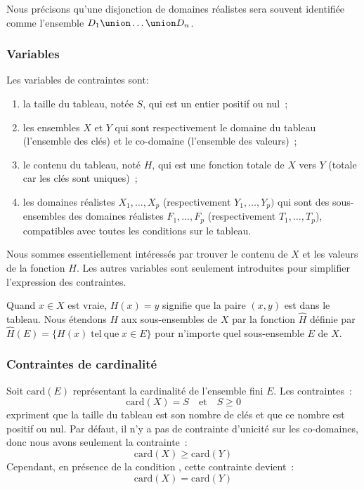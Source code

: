 Nous précisons qu'une disjonction de domaines réalistes  sera souvent identifiée comme l'ensemble $D_1 \union \dots \union
D_n$.

\subsubsection{Variables}

Les variables de contraintes sont:
%
\begin{enumerate}

\item la taille du tableau, notée $S$, qui est un entier positif ou nul~;

\item les ensembles $X$ et $Y$ qui sont respectivement le domaine du tableau
(l'ensemble des clés) et le co-domaine (l'ensemble des valeurs)~;

\item le contenu du tableau, noté $H$, qui est une fonction totale de $X$ vers
$Y$ (totale car les clés sont uniques)~;

\item les domaines réalistes $X_1, \dots, X_p$ (respectivement $Y_1, \dots,
Y_p)$ qui sont des sous-ensembles des domaines réalistes $F_1, \dots, F_p$
(respectivement $T_1, \dots, T_p$), compatibles avec toutes les conditions sur
le tableau.

\end{enumerate}

Nous sommes essentiellement intéressés par trouver le contenu de $X$ et les
valeurs de la fonction $H$. Les autres variables sont seulement introduites pour
simplifier l'expression des contraintes.

Quand $x \in X$ est vraie, $H(x) = y$ signifie que la paire $(x, y)$ est dans le
tableau. Nous étendons $H$ aux sous-ensembles de $X$ par la fonction $\hat{H}$
définie par $\hat{H}(E) = \{H(x) \;\mathrm{tel~que}\; x \in E\}$ pour
n'importe quel sous-ensemble $E$ de $X$.

\subsubsection{Contraintes de cardinalité}

Soit $\mathrm{card}(E)$ représentant la cardinalité de l'ensemble fini $E$. Les
contraintes~:
%
$$\mathrm{card}(X) = S \quad\mathrm{et}\quad S \geq 0$$
%
expriment que la taille du tableau est son nombre de clés et que ce nombre est
positif ou nul. Par défaut, il n'y a pas de contrainte d'unicité sur les
co-domaines, donc nous avons seulement la contrainte~:
%
$$\mathrm{card}(X) \geq \mathrm{card}(Y)$$
%
Cependant, en présence de la condition , cette contrainte
devient~:
%
$$\mathrm{card}(X) = \mathrm{card}(Y)$$

